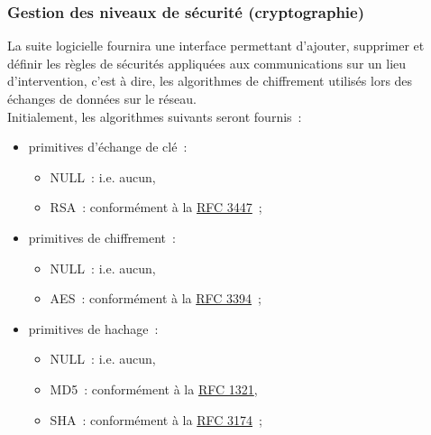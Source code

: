 \subsubsection{Gestion des niveaux de sécurité (cryptographie)}
La suite logicielle fournira une interface permettant d'ajouter, supprimer et définir les règles de sécurités appliquées aux communications sur un lieu d'intervention, c'est à dire, les algorithmes de chiffrement utilisés lors des échanges de données sur le réseau.
\\
Initialement, les algorithmes suivants seront fournis~:
\begin{itemize}
	\item primitives d'échange de clé~:
	\begin{itemize}
		\item NULL~: i.e. aucun,
		\item RSA~: conformément à la \href{http://tools.ietf.org/html/rfc3447}{RFC 3447}~;
	\end{itemize}
	\item primitives de chiffrement~:
	\begin{itemize}
		\item NULL~: i.e. aucun,
		\item AES~: conformément à la \href{http://tools.ietf.org/html/rfc3394}{RFC 3394}~;
	\end{itemize}
	\item primitives de hachage~:
	\begin{itemize}
		\item NULL~: i.e. aucun,
		\item MD5~: conformément à la \href{http://tools.ietf.org/html/rfc1321}{RFC 1321},
		\item SHA~: conformément à la \href{http://tools.ietf.org/html/rfc3174}{RFC 3174}~;
	\end{itemize}
\end{itemize}


